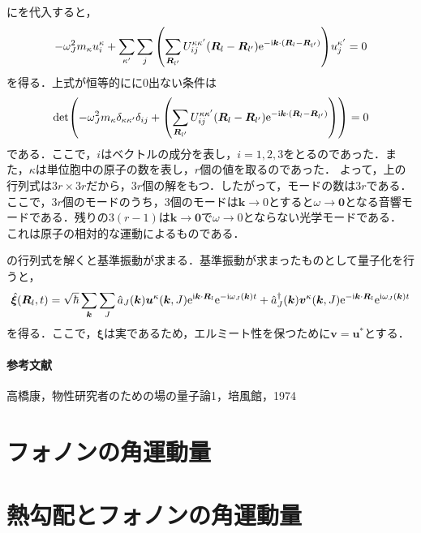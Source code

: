 \documentclass{report}
\begin{document}
にを代入すると，
\begin{align}
  -\omega_J^2 m_\kappa u_{i}^{\kappa} + \sum_{\kappa'} \sum_{j} \qty(\sum_{\bm{R}_{l'}} U_{ij}^{\kappa\kappa'}(\bm{R}_l - \bm{R}_{l'})\mathrm{e}^{-\mathrm{i}\bm{k}\cdot(\bm{R}_l-\bm{R}_{l'})}) u_j^{\kappa'}=0
\end{align}
を得る．上式が恒等的にに0出ない条件は
\begin{align}
  \det(-\omega_J^2 m_{\kappa}\delta_{\kappa\kappa'}\delta_{ij} + \qty(\sum_{\bm{R}_{l'}} U_{ij}^{\kappa\kappa'}(\bm{R}_l - \bm{R}_{l'})\mathrm{e}^{-\mathrm{i}\bm{k}\cdot(\bm{R}_l-\bm{R}_{l'})})) = 0 \label{det}
\end{align}
である．ここで，$i$はベクトルの成分を表し，$i=1,2,3$をとるのであった．また，$\kappa$は単位胞中の原子の数を表し，$r$個の値を取るのであった．
よって，上の行列式は$3r\times 3r$だから，$3r$個の解をもつ．したがって，モードの数は$3r$である．ここで，$3r$個のモードのうち，3個のモードは$\bm{k}\to0$とすると$\omega\to\bm{0}$となる音響モードである．残りの$3(r-1)$は$\bm{k}\to\bm{0}$で$\omega\to0$とならない光学モードである．
これは原子の相対的な運動によるものである．

の行列式を解くと基準振動が求まる．基準振動が求まったものとして量子化を行うと，
\begin{align}
  \hat{\bm{\xi}} (\bm{R}_l,t) = \sqrt{\hbar}\sum_{\bm{k}}\sum_{J} \hat{a}_J (\bm{k})\bm{u}^{\kappa}(\bm{k},J)\mathrm{e}^{\mathrm{i}\bm{k}\cdot\bm{R}_l}\mathrm{e}^{-\mathrm{i}\omega_J(\bm{k})t} + \hat{a}^{\dagger}_{J}(\bm{k})\bm{v}^{\kappa}(\bm{k},J)\mathrm{e}^{-\mathrm{i}\bm{k}\cdot\bm{R}_l}\mathrm{e}^{\mathrm{i}\omega_J(\bm{k})t}
\end{align}
を得る．ここで，$\bm{\xi}$は実であるため，エルミート性を保つために$\bm{v}=\bm{u}^{*}$とする．

\paragraph*{参考文献}
高橋康，物性研究者のための場の量子論1，培風館，1974

\section{フォノンの角運動量}

\section{熱勾配とフォノンの角運動量}
\end{document}
